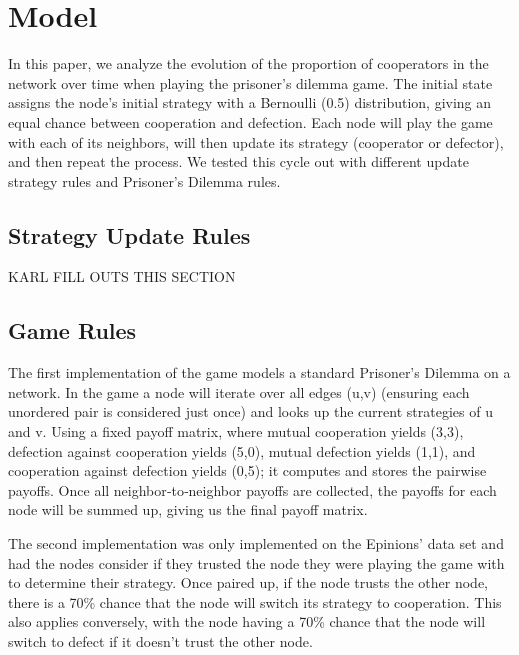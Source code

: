 \section{Model}

In this paper, we analyze the evolution of the proportion of cooperators in the network over time when playing the prisoner's dilemma game. The initial state assigns the node’s initial strategy with a Bernoulli (0.5) distribution, giving an equal chance between cooperation and defection. Each node will play the game with each of its neighbors, will then update its strategy (cooperator or defector), and then repeat the process. We tested this cycle out with different update strategy rules and Prisoner's Dilemma rules. 

\subsection{Strategy Update Rules}
KARL FILL OUTS THIS SECTION

\subsection{Game Rules}
The first implementation of the game models a standard Prisoner's Dilemma on a network. In the game a node will iterate over all edges (u,v) (ensuring each unordered pair is considered just once) and looks up the current strategies of u and v. Using a fixed payoff matrix, where mutual cooperation yields (3,3), defection against cooperation yields (5,0), mutual defection yields (1,1), and cooperation against defection yields (0,5); it computes and stores the pairwise payoffs. Once all neighbor‐to‐neighbor payoffs are collected, the payoffs for each node will be summed up, giving us the final payoff matrix.

The second implementation was only implemented on the Epinions' data set and had the nodes consider if they trusted the node they were playing the game with to determine their strategy. Once paired up, if the node trusts the other node, there is a 70\% chance that the node will switch its strategy to cooperation. This also applies conversely, with the node having a 70\% chance that the node will switch to defect if it doesn't trust the other node. 
